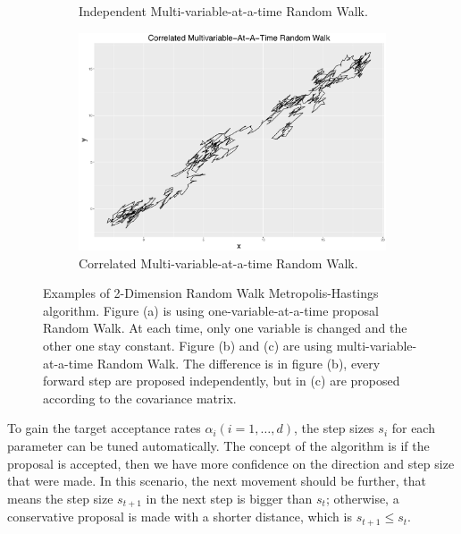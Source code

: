 \begin{figure}[h]
\begin{subfigure}[b]{0.32\textwidth}
    \caption{\footnotesize Independent Multi-variable-at-a-time Random Walk.}
\end{subfigure}
\begin{subfigure}[b]{0.32\textwidth}
     \includegraphics[width=\textwidth]{Chapters/05MCMCOU/plots/ggcorRW.pdf}   
    \caption{\footnotesize Correlated Multi-variable-at-a-time Random Walk.}
\end{subfigure}
\caption{Examples of 2-Dimension Random Walk Metropolis-Hastings algorithm. Figure (a) is using one-variable-at-a-time proposal Random Walk. At each time, only one variable is changed and the other one stay constant. Figure (b) and (c) are using multi-variable-at-a-time Random Walk. The difference is in figure (b), every forward step are proposed independently, but in (c) are proposed according to the covariance matrix. }
\label{randomwalk}
\end{figure}
To gain the target acceptance rates $\alpha_i (i = 1, \dots, d)$, the step sizes $s_i$ for each parameter can be tuned automatically. The concept of the algorithm is if the proposal is accepted, then we have more confidence on the direction and step size that were made. In this scenario, the next movement should be further, that means the step size $s_{t+1}$ in the next step is bigger than $s_t$; otherwise, a conservative proposal is made with a shorter distance, which is $s_{t+1}\leq s_t$. 

